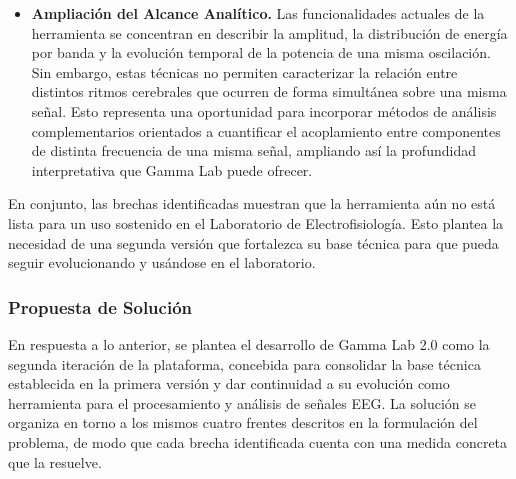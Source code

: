 \documentclass[12pt,letterpaper,oneside]{article}
\begin{document}
\begin{itemize}
  \item \textbf{Ampliación del Alcance Analítico.} Las funcionalidades actuales de la herramienta se concentran en describir la amplitud, la distribución de energía por banda y la evolución temporal de la potencia de una misma oscilación. Sin embargo, estas técnicas no permiten caracterizar la relación entre distintos ritmos cerebrales que ocurren de forma simultánea sobre una misma señal. Esto representa una oportunidad para incorporar métodos de análisis complementarios orientados a cuantificar el acoplamiento entre componentes de distinta frecuencia de una misma señal, ampliando así la profundidad interpretativa que Gamma Lab puede ofrecer.
\end{itemize}

En conjunto, las brechas identificadas muestran que la herramienta aún no está lista para un uso sostenido en el Laboratorio de Electrofisiología. Esto plantea la necesidad de una segunda versión que fortalezca su base técnica para que pueda seguir evolucionando y usándose en el laboratorio.

\subsubsection{Propuesta de Solución}

En respuesta a lo anterior, se plantea el desarrollo de Gamma Lab 2.0 como la segunda iteración de la plataforma, concebida para consolidar la base técnica establecida en la primera versión y dar continuidad a su evolución como herramienta para el procesamiento y análisis de señales EEG. La solución se organiza en torno a los mismos cuatro frentes descritos en la formulación del problema, de modo que cada brecha identificada cuenta con una medida concreta que la resuelve.
\end{document}
